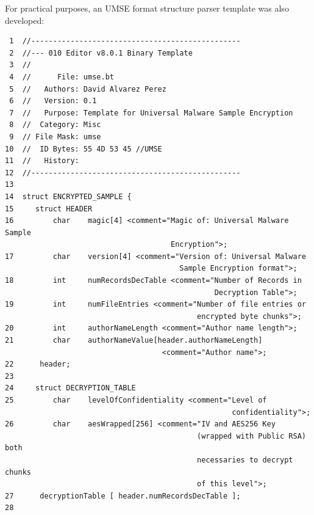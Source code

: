 For practical purposes, an UMSE format structure parser template was also
developed:

\begin{tcolorbox}
  \footnotesize
\begin{verbatim}
 1  //------------------------------------------------
 2  //--- 010 Editor v8.0.1 Binary Template
 3  //
 4  //      File: umse.bt
 5  //   Authors: David Alvarez Perez
 6  //   Version: 0.1
 7  //   Purpose: Template for Universal Malware Sample Encryption
 8  //  Category: Misc
 9  // File Mask: umse
10  //  ID Bytes: 55 4D 53 45 //UMSE
11  //   History: 
12  //------------------------------------------------
13
14  struct ENCRYPTED_SAMPLE {
15     struct HEADER
16         char    magic[4] <comment="Magic of: Universal Malware Sample 
                                      Encryption">;
17         char    version[4] <comment="Version of: Universal Malware 
                                        Sample Encryption format">;
18         int     numRecordsDecTable <comment="Number of Records in 
                                                Decryption Table">;
19         int     numFileEntries <comment="Number of file entries or 
                                            encrypted byte chunks">;
20         int     authorNameLength <comment="Author name length">;
21         char    authorNameValue[header.authorNameLength] 
                                    <comment="Author name">;
22      header;	
23 
24     struct DECRYPTION_TABLE 
25         char    levelOfConfidentiality <comment="Level of 
                                                    confidentiality">;
26         char    aesWrapped[256] <comment="IV and AES256 Key 
                                            (wrapped with Public RSA) both 
                                            necessaries to decrypt chunks 
                                            of this level">;
27      decryptionTable [ header.numRecordsDecTable ];
28 
\end{verbatim}
\end{tcolorbox}

